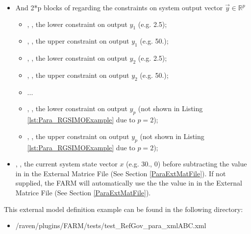\begin{itemize}
  \item And 2*p blocks of  regarding the constraints on system output vector 
  \begin{math} \overrightarrow{y}\in\mathbb{R}^p \end{math}
  \begin{itemize}
    \item {}, , 
    the lower constraint on output \begin{math} y_1 \end{math} (e.g. 2.5);
    \item {}, , 
    the upper constraint on output \begin{math} y_1 \end{math} (e.g. 50.);
    \item {}, , 
    the lower constraint on output \begin{math} y_2 \end{math} (e.g. 2.5);
    \item {}, , 
    the upper constraint on output \begin{math} y_2 \end{math} (e.g. 50.);
    \item ...
    \item {}, , 
    the lower constraint on output \begin{math} y_p \end{math} (not shown in Listing 
    \ref{lst:Para_RGSIMOExample} due to $p=2$);
    \item {}, , 
    the upper constraint on output \begin{math} y_p \end{math} (not shown in Listing 
    \ref{lst:Para_RGSIMOExample} due to $p=2$);
  \end{itemize}
  \item {}, ,
  the current system state vector \begin{math} x \end{math} (e.g. 30., 0) before subtracting 
  the value in  in the External Matrice File (See Section \ref{ParaExtMatFile}). 
  If not supplied, the FARM will automatically use the the value in  in the 
  External Matrice File (See Section \ref{ParaExtMatFile}).
\end{itemize}
This external model definition example can be found in the following directory:
\begin{itemize}
  \item /raven/plugins/FARM/tests/test\_RefGov\_para\_xmlABC.xml
\end{itemize}

